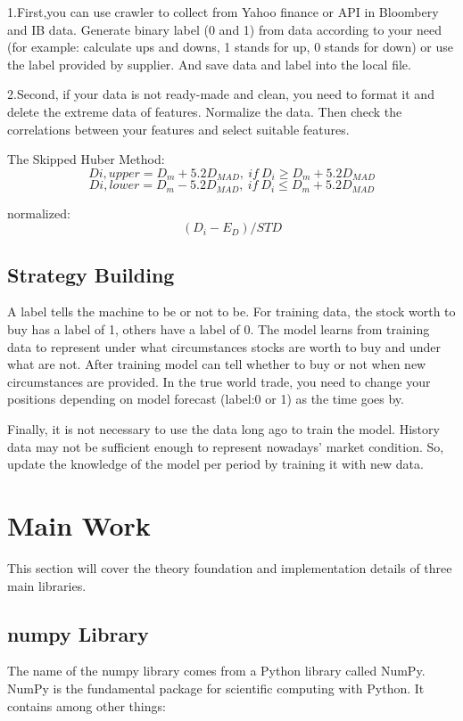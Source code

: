 \documentclass[letterpaper]{article}
\begin{document}
1.First,you can use crawler to collect from Yahoo finance or API in Bloombery and IB data. Generate binary label (0 and 1) from data according to your need (for example: calculate ups and downs, 1 stands for up, 0 stands for down) or use the label provided by supplier. And save data and label into the local file.


2.Second, if your data is not ready-made and clean, you need to format it and delete the extreme data of features. Normalize the data. Then check the correlations between your features and select suitable features.

The Skipped Huber Method:
\[ D{i,upper} = D_m +5.2D_{MAD},     \ if \ D_i \geq D_m+5.2D_{MAD} \]
\[ D{i,lower} = D_m -5.2D_{MAD},     \ if \ D_i \leq D_m+5.2D_{MAD} \]

normalized:\[ (D_i-E_D)/STD\]

\subsection{Strategy Building}
A label tells the machine to be or not to be. For training data, the stock worth to buy has a label of 1, others have a label of 0. The model learns from training data to represent under what circumstances stocks are worth to buy and under what are not. After training model can tell whether to buy or not when new circumstances are provided. In the true world trade, you need to change your positions depending on model forecast (label:0 or 1) as the time goes by. 


Finally, it is not necessary to use the data long ago to train the model. History data may not be sufficient enough to represent nowadays’ market condition. So, update the knowledge of the model per period by training it with new data.

\section{Main Work}
This section will cover the theory foundation and implementation details of three main libraries.   

\subsection{numpy Library}
The name of the numpy library comes from a Python library called NumPy. NumPy is the fundamental package for scientific computing with Python.\cite{nano2} It contains among other things:
\end{document}
